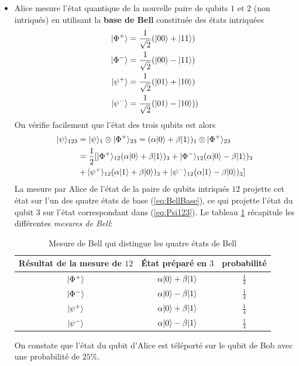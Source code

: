 \begin{itemize}
\item Alice mesure l'état quantique de la nouvelle paire de qubits $1$ et $2$
(non intriqués) en utilisant la \textbf{base de Bell} constituée des états
intriquées%
\begin{subequations}%
\label{eq:BellBase}%
\begin{align}
\vert\Phi^{+}\rangle &  =\frac{1}{\sqrt{2}}(\vert00\rangle+\vert11\rangle )\\
\vert\Phi^{-}\rangle &  =\frac{1}{\sqrt{2}}(\vert00\rangle-\vert11\rangle )\\
\vert\psi^{+}\rangle &  =\frac{1}{\sqrt{2}}(\vert01\rangle+\vert10\rangle )\\
\vert\psi^{-}\rangle &  =\frac{1}{\sqrt{2}}(\vert01\rangle-\vert10\rangle ))
\end{align}%
\end{subequations}%
On vérifie facilement que l'état des trois qubits est alors%
\begin{equation}%
\label{eq:Psi123}%
\begin{split}
\ket{\psi}_{123} &  =\ket{\psi}_{1}\otimes\ket{\Phi^{+}}_{23}
=(\alpha\ket{0}+\beta\ket{1})_{1}\otimes\ket{\Phi^{+}}_{23}\\
&  =\frac{1}{2}[\ket{\Phi^{+}}_{12}(\alpha\ket{0}+\beta\ket{1})_{3}+\ket{\Phi
^{-}}_{12}(\alpha\ket{0}-\beta\ket{1})_{3}\\
&  +\ket{\psi^{+}}_{12}(\alpha\ket{1}+\beta\ket{0})_{3}+\ket{\psi^{-}}_{12}
(\alpha\ket{1} -\beta\ket{0})_{3}] \end{split}
\end{equation}%
La mesure par Alice de l'état de la paire de qubits intriqués $12$ projette
cet état sur l'un des quatre états de base (\ref{eq:BellBase}), ce qui
projette l'état du qubit $3$ sur l'état correspondant dans (\ref{eq:Psi123}).
Le tableau \ref{tab:MesBell} récapitule les différentes \emph{mesures de
Bell}:
\begin{table}[htbp]
\centering
\begin{tabular}
[c]{|l|l|l|}\hline\hline
\rowcolor[gray]{0.8}\textbf{Résultat de la mesure de $12$} & \textbf{État
préparé en $3$} & \textbf{probabilité}\\\hline\hline
\multicolumn{1}{|c|}{$\vert\Phi^{+}\rangle$} &
\multicolumn{1}{|c|}{$\alpha\vert0\rangle+\beta\vert1\rangle$} &
\multicolumn{1}{|c|}{$\frac{1}{4}$}\\\hline
\multicolumn{1}{|c|}{$\vert\Phi^{-}\rangle$} &
\multicolumn{1}{|c|}{$\alpha\vert0\rangle-\beta\vert1\rangle$} &
\multicolumn{1}{|c|}{$\frac{1}{4}$}\\\hline
\multicolumn{1}{|c|}{$\vert\psi^{+}\rangle$} &
\multicolumn{1}{|c|}{$\alpha\vert0\rangle+\beta\vert1\rangle$} &
\multicolumn{1}{|c|}{$\frac{1}{4}$}\\\hline
\multicolumn{1}{|c|}{$\vert\psi^{-}\rangle$} &
\multicolumn{1}{|c|}{$\alpha\vert0\rangle-\beta\vert1\rangle$} &
\multicolumn{1}{|c|}{$\frac{1}{4}$}\\\hline
\end{tabular}
\caption{Mesure de Bell qui distingue les quatre états de Bell}
\label{tab:MesBell}%
\end{table}%
On constate que l'état du qubit d'Alice est téléporté sur le qubit de Bob avec
une probabilité de $25\%$.


\end{itemize}
